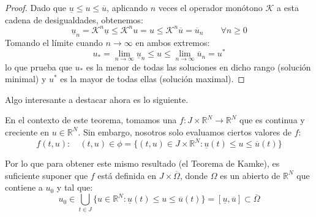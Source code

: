 \begin{proof}
    Dado que $\underline{u} \leq u \leq \overline{u}$, aplicando $n$ veces el operador monótono $\mathcal{K}$ a esta cadena de desigualdades, obtenemos:
    \[
        \underline{u}_n = \mathcal{K}^n\underline{u} \leq \mathcal{K}^n u = u \leq \mathcal{K}^n\overline{u} = \overline{u}_n \qquad \forall n \geq 0
    \]
    Tomando el límite cuando $n \to \infty$ en ambos extremos:
    \[
        u_* = \lim_{n \to \infty} \underline{u}_n \leq u \leq \lim_{n \to \infty} \overline{u}_n = u^*
    \]
    lo que prueba que $u_*$ es la menor de todas las soluciones en dicho rango (solución minimal) y $u^*$ es la mayor de todas ellas (solución maximal).
\end{proof}

Algo interesante a destacar ahora es lo siguiente.

\begin{observación}
    En el contexto de este teorema, tomamos una $f: J \times \mathbb{R}^N \to \mathbb{R}^N$ que es continua y creciente en $u \in \mathbb{R}^N$. Sin embargo, nosotros solo evaluamos ciertos valores de $f$:
    \[
        f(t, u) : \quad
        (t,u) \in \phi =
        \{
            (t, u) \in J \times \mathbb{R}^N :
            \underline{u}(t) \leq u \leq \overline{u}(t)
        \}
    \]

    Por lo que para obtener este mismo resultado (el Teorema de Kamke), es suficiente suponer que $f$ está definida en $J \times \overline{\Omega}$, donde $\Omega$ es un abierto de $\mathbb{R}^N$ que contiene a $u_0$ y tal que:
    \[
    u_0 \in
    \bigcup_{t \in J} \{
        u \in \mathbb{R}^N : \underline{u}(t) \leq u \leq \overline{u}(t)
    \}
    =
    [ \underline{u} , \overline{u} ]
    \subset
    \overline{\Omega}
    \]
\end{observación}

